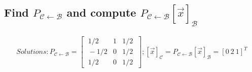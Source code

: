 \documentclass[../main.tex]{subfiles}
\begin{document}
\subsection{Find $P_{\mathcal{C} \leftarrow \mathcal{B}}$ and compute $P_{\mathcal{C} \leftarrow \mathcal{B}}[\vec{x}]_{\mathcal{B}}$}
\begin{align*}
        \boxed{
        Solutions: P_{\mathcal{C} \leftarrow \mathcal{B}} =
        \begin{bmatrix}
                \ {1}/{2}  & 1 & {1}/{2} \ \\
                \ -{1}/{2} & 0 & {1}/{2} \ \\
                \ {1}/{2}  & 0 & {1}/{2} \
        \end{bmatrix}; [\vec{x}]_\mathcal{C} = P_{\mathcal{C} \leftarrow \mathcal{B}}[\vec{x}]_{\mathcal{B}} = [0 \ 2 \ 1]^T
                }
\end{align*}
\end{document}
